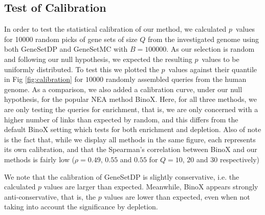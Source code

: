 \documentclass[10pt,letterpaper]{article}
\begin{document}
\subsection*{Test of Calibration}

In order to test the statistical calibration of our method, we calculated $p$~values for 10000 random picks of gene sets of size $Q$ from the investigated genome using both GeneSetDP and GeneSetMC with $B = 100000$. As our selection is random and following our null hypothesis, we expected the resulting $p$~values to be uniformly distributed. To test this we plotted the $p$~values against their quantile in Fig \ref{fig:calibration} for $10000$ randomly assembled queries from the human genome. As a comparison, we also added a calibration curve, under our null hypothesis, for the popular NEA method BinoX\cite{ogris2016novel}. Here, for all three methods, we are only testing the queries for enrichment, that is, we are only concerned with a higher number of links than expected by random, and this differs from the default BinoX setting which tests for both enrichment and depletion.
Also of note is the fact that, while we display all methods in the same figure, each represents its own calibration, and that the Spearman's correlation between BinoX and our methods is fairly low ($\rho = 0.49$, $0.55$ and $0.55$ for $Q=10$, $20$ and $30$ respectively)

We note that the calibration of GeneSetDP is slightly conservative, i.e. the calculated $p$ values are larger than expected. Meanwhile, BinoX appears strongly anti-conservative, that is, the $p$ values are lower than expected, even when not taking into account the significance by depletion.
\end{document}
